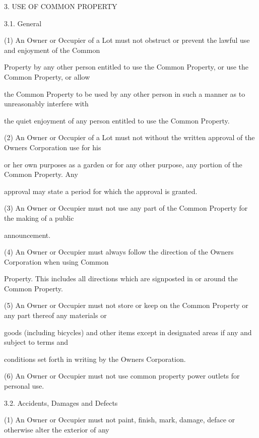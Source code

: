 \documentclass{article}
\begin{document}
{\fontsize{9.99}{1}3. USE OF COMMON PROPERTY }

{\fontsize{9.99}{1}3.1. General }

{\fontsize{9.962}{1}(1) An Owner or Occupier of a Lot must not obstruct or prevent the lawful use and enjoyment of the Common }

{\fontsize{10.02}{1}Property by any other person entitled to use the Common Property, or use the Common Property, or allow }

{\fontsize{10.02}{1}the Common Property to be used by any other person in such a manner as to unreasonably interfere with }

{\fontsize{10.02}{1}the quiet enjoyment of any person entitled to use the Common Property. }

{\fontsize{9.962}{1}(2) An Owner or Occupier of a Lot must not without the written approval of the Owners Corporation use for his }

{\fontsize{10.02}{1}or her own purposes as a garden or for any other purpose, any portion of the Common Property. Any }

{\fontsize{10.02}{1}approval may state a period for which the approval is granted. }

{\fontsize{9.962}{1}(3) An Owner or Occupier must not use any part of the Common Property for the making of a public }

{\fontsize{10.02}{1}announcement. }

{\fontsize{9.962}{1}(4) An Owner or Occupier must always follow the direction of the Owners Corporation when using Common }

{\fontsize{10.02}{1}Property. This includes all directions which are signposted in or around the Common Property. }

{\fontsize{9.962}{1}(5) An Owner or Occupier must not store or keep on the Common Property or any part thereof any materials or }

{\fontsize{10.02}{1}goods (including bicycles) and other items except in designated areas if any and subject to terms and }

{\fontsize{10.02}{1}conditions set forth in writing by the Owners Corporation. }

{\fontsize{9.962}{1}(6) An Owner or Occupier must not use common property power outlets for personal use. }

{\fontsize{9.99}{1}3.2. Accidents, Damages and Defects }

{\fontsize{9.962}{1}(1) An Owner or Occupier must not paint, finish, mark, damage, deface or otherwise alter the exterior of any }
\end{document}
